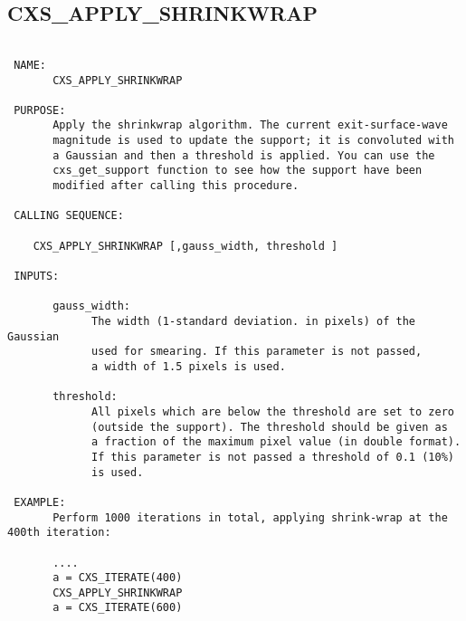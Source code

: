  
 
\subsection{CXS\_APPLY\_SHRINKWRAP}
\begin{verbatim}

 NAME:
       CXS_APPLY_SHRINKWRAP

 PURPOSE:
       Apply the shrinkwrap algorithm. The current exit-surface-wave
       magnitude is used to update the support; it is convoluted with
       a Gaussian and then a threshold is applied. You can use the
       cxs_get_support function to see how the support have been
       modified after calling this procedure.

 CALLING SEQUENCE:

	CXS_APPLY_SHRINKWRAP [,gauss_width, threshold ]

 INPUTS:

       gauss_width: 
             The width (1-standard deviation. in pixels) of the Gaussian
             used for smearing. If this parameter is not passed, 
             a width of 1.5 pixels is used.

       threshold:
             All pixels which are below the threshold are set to zero 
             (outside the support). The threshold should be given as
             a fraction of the maximum pixel value (in double format). 
             If this parameter is not passed a threshold of 0.1 (10%)
             is used.

 EXAMPLE:
       Perform 1000 iterations in total, applying shrink-wrap at the 400th iteration:

       ....
       a = CXS_ITERATE(400)
       CXS_APPLY_SHRINKWRAP
       a = CXS_ITERATE(600)

\end{verbatim}


